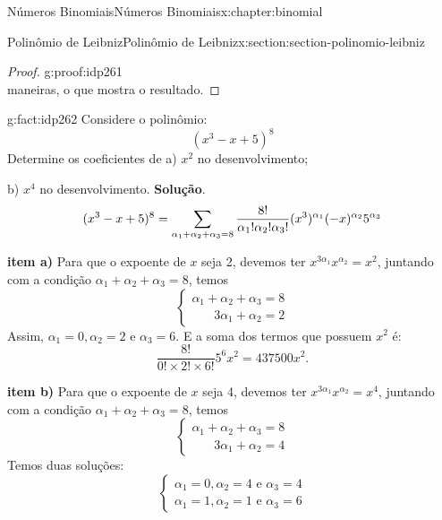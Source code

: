 \documentclass[oneside,10pt,]{book}
\newcommand{\blocktitlefont}{\relax}
\newcommand{\terminology}[1]{\textbf{#1}}
\numberwithin{equation}{section}
\begin{document}
\begin{chapterptx}{Números Binomiais}{}{Números Binomiais}{}{}{x:chapter:binomial}
\begin{sectionptx}{Polinômio de Leibniz}{}{Polinômio de Leibniz}{}{}{x:section:section-polinomio-leibniz}
\begin{proof}{}{g:proof:idp261}
\begin{equation*}
\end{equation*}
maneiras, o que mostra o resultado.%
\end{proof}
\begin{fact}{}{}{g:fact:idp262}%
Considere o polinômio:%
\begin{equation*}
(x^3-x+5)^8 
\end{equation*}
Determine os coeficientes de a) \(x^2\) no desenvolvimento;%
 \par
b) \(x^4\) no desenvolvimento.%
%
\textbf{\blocktitlefont Solução}.\quad{}%
\begin{equation*}
(x^3-x+5)^8   = \sum_{\alpha_1 + \alpha_2 + \alpha_3 = 8} \frac{8!}{\alpha_1!\alpha_2!\alpha_3!}(x^3)^{\alpha_1}(-x)^{\alpha_2}5^{\alpha_3}\\
\end{equation*}
%
\par
\terminology{item a)} Para que o expoente de \(x\) seja 2, devemos ter \(x^{3\alpha_1}x^{\alpha_2} = x^2\), juntando com a condição \(\alpha_1+\alpha_2+\alpha_3 = 8\), temos%
\begin{equation*}
\begin{cases} 
\alpha_1 + \alpha_2 +\alpha_3    =  8 \\
~~~~ ~~~~ 3\alpha_1 + \alpha_2  =  2 \end{cases}
\end{equation*}
Assim, \(\alpha_1 = 0, \alpha_2 = 2\) e \(\alpha_3 = 6.\) E a soma dos termos que possuem \(x^2\) é:%
\begin{equation*}
\frac{8!}{0!\times 2! \times 6!} 5^6x^2 = 437500x^2.
\end{equation*}
%
\par
\terminology{item b)} Para que o expoente de \(x\) seja 4, devemos ter \(x^{3\alpha_1}x^{\alpha_2} = x^4\), juntando com a condição \(\alpha_1+\alpha_2+\alpha_3 = 8\), temos%
\begin{equation*}
\begin{cases} 
\alpha_1 + \alpha_2 +\alpha_3    =  8 \\
~~~~ ~~~~ 3\alpha_1 + \alpha_2  =  4 \end{cases}
\end{equation*}
Temos duas soluções:%
\begin{equation*}
\begin{cases} 
\alpha_1 = 0, \alpha_2 = 4 \text{ e }\alpha_3 = 4 \\
\alpha_1 = 1, \alpha_2 = 1 \text{ e } \alpha_3 = 6 \end{cases}
\end{equation*}

\end{fact}
\end{sectionptx}
\end{chapterptx}
\end{document}
